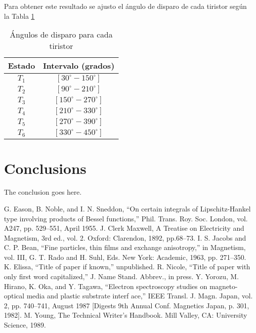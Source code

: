 \documentclass[conference]{IEEEtran}
\begin{document}


Para obtener este resultado se ajusto el ángulo de disparo de cada tiristor según la Tabla \ref{tab:angulos_disparo}

\begin{table}[h!]
	\centering
	\small
	\begin{tabular}{@{}cc@{}}
		\toprule
		Estado & Intervalo (grados) \\ \midrule
	    $T_{1}$ & $[30^\circ- 150^\circ]$ \\
		$T_{2}$ & $[90^\circ- 210^\circ]$ \\
		$T_{3}$ & $[150^\circ-270^\circ]$ \\
		$T_{4}$ & $[210^\circ-330^\circ]$ \\
		$T_{5}$ & $[270^\circ-390^\circ]$ \\
		$T_{6}$ & $[330^\circ-450^\circ]$ \\ \bottomrule
	\end{tabular}
	\caption{Ángulos de disparo para cada tiristor}
	\label{tab:angulos_disparo}
\end{table}




\section{Conclusions}
The conclusion goes here.

\begin{thebibliography}{plain}
 G. Eason, B. Noble, and I. N. Sneddon, ``On certain integrals of Lipschitz-Hankel type involving products of Bessel functions,'' Phil. Trans. Roy. Soc. London, vol. A247, pp. 529--551, April 1955.
 J. Clerk Maxwell, A Treatise on Electricity and Magnetism, 3rd ed., vol. 2. Oxford: Clarendon, 1892, pp.68--73.
 I. S. Jacobs and C. P. Bean, ``Fine particles, thin films and exchange anisotropy,'' in Magnetism, vol. III, G. T. Rado and H. Suhl, Eds. New York: Academic, 1963, pp. 271--350.
 K. Elissa, ``Title of paper if known,'' unpublished.
 R. Nicole, ``Title of paper with only first word capitalized,'' J. Name Stand. Abbrev., in press.
 Y. Yorozu, M. Hirano, K. Oka, and Y. Tagawa, ``Electron spectroscopy studies on magneto-optical media and plastic substrate interf	ace,'' IEEE Transl. J. Magn. Japan, vol. 2, pp. 740--741, August 1987 [Digests 9th Annual Conf. Magnetics Japan, p. 301, 1982].
 M. Young, The Technical Writer's Handbook. Mill Valley, CA: University Science, 1989.
\end{thebibliography}
\end{document}
